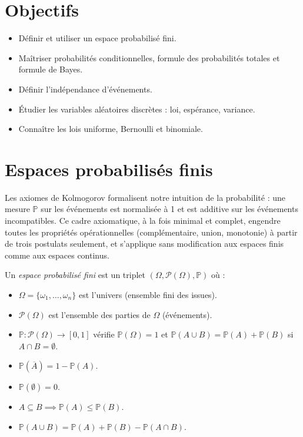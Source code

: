 \documentclass[11pt,a4paper,twoside]{book}
\begin{document}
\section*{Objectifs}
\begin{itemize}[leftmargin=1.5em]
  \item Définir et utiliser un espace probabilisé fini.
  \item Maîtriser probabilités conditionnelles, formule des probabilités totales et formule de Bayes.
  \item Définir l'indépendance d'événements.
  \item Étudier les variables aléatoires discrètes : loi, espérance, variance.
  \item Connaître les lois uniforme, Bernoulli et binomiale.
\end{itemize}

\section{Espaces probabilisés finis}

Les axiomes de Kolmogorov formalisent notre intuition de la probabilité : une mesure $\mathbb{P}$ sur les événements est normalisée à 1 et est additive sur les événements incompatibles. Ce cadre axiomatique, à la fois minimal et complet, engendre toutes les propriétés opérationnelles (complémentaire, union, monotonie) à partir de trois postulats seulement, et s'applique sans modification aux espaces finis comme aux espaces continus.

\begin{definitionbox}
Un \emph{espace probabilisé fini} est un triplet $(\Omega, \mathcal{P}(\Omega), \mathbb{P})$ où :
\begin{itemize}
  \item $\Omega = \{\omega_1,\ldots,\omega_n\}$ est l'univers (ensemble fini des issues).
  \item $\mathcal{P}(\Omega)$ est l'ensemble des parties de $\Omega$ (événements).
  \item $\mathbb{P} : \mathcal{P}(\Omega) \to [0,1]$ vérifie $\mathbb{P}(\Omega)=1$ et
    $\mathbb{P}(A\cup B)=\mathbb{P}(A)+\mathbb{P}(B)$ si $A\cap B=\emptyset$.
\end{itemize}
\end{definitionbox}

\begin{theoremebox}
\begin{itemize}
  \item $\mathbb{P}(\overline{A})=1-\mathbb{P}(A)$.
  \item $\mathbb{P}(\emptyset)=0$.
  \item $A\subseteq B \implies \mathbb{P}(A)\leq\mathbb{P}(B)$.
  \item $\mathbb{P}(A\cup B)=\mathbb{P}(A)+\mathbb{P}(B)-\mathbb{P}(A\cap B)$.
\end{itemize}
\end{theoremebox}
\end{document}
